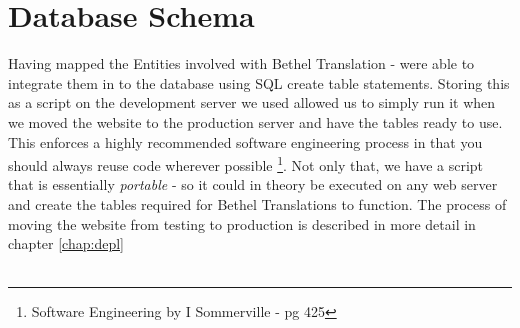\documentclass{l3proj}
\begin{document}
\section{Database Schema} \label{sect:db-sch} Having mapped the Entities
involved with Bethel Translation -  were able to integrate them in to the
database using SQL create table statements. Storing this as a script on the
development server we used allowed us to simply run it when we moved the
website to the production server and have the tables ready to use.  This
enforces a highly recommended software engineering process in that you should
always reuse code wherever possible \footnote{Software Engineering by I
Sommerville - pg 425}. Not only that, we have a script that is essentially
\textit{portable} - so it could in theory be executed on any web server and
create the tables required for Bethel Translations to function. The process of
moving the website from testing to production is described in more detail in
chapter \ref{chap:depl}  \\
\\
\end{document}
